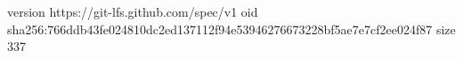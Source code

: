 version https://git-lfs.github.com/spec/v1
oid sha256:766ddb43fe024810dc2ed137112f94e53946276673228bf5ae7e7cf2ee024f87
size 337
